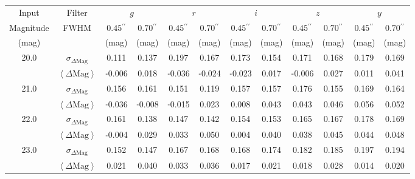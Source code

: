 \documentclass[useamsfonts]{pasj01}
\def\asec{$^{\prime\prime}$}
\def\cmodel{\texttt{cModel}}
\def\forced{\texttt{forced}}
\newcommand{\minus}{\raisebox{.4\height}{\scalebox{.8}{-}}}
\newcommand{\smag}{$\sigma_{\Delta\mathrm{Mag}}$}
\newcommand{\mmag}{$\left<{\Delta\mathrm{Mag}}\right>$}
\newcommand{\n}{$\minus$}
\begin{document}
\begin{table}
    \begin{center}
    \begin{tabular}{| c | c | c | c | c | c | c | c | c | c | c | c |}
    \hline
    \rowcolor[gray]{.85} \multicolumn{12}{|c|}{\large{Table}: Summary of \forced{} \cmodel{} Magnitude} \\
    \hline \hline 
    Input & Filter & \multicolumn{2}{|c|}{$g$} & \multicolumn{2}{|c|}{$r$} & \multicolumn{2}{|c|}{$i$} & \multicolumn{2}{|c|}{$z$} & \multicolumn{2}{|c|}{$y$} \\
    \cline{2-12}
    Magnitude & FWHM & $0.45$\asec{} & $0.70$\asec{} & $0.45$\asec{} & $0.70$\asec{} & $0.45$\asec{} & $0.70$\asec{} & $0.45$\asec{} & $0.70$\asec{} & $0.45$\asec{} & $0.70$\asec{} \\
    \hline
    (mag) & & (mag) & (mag) & (mag) & (mag) & (mag) & (mag) & (mag) & (mag) & (mag) & (mag) \\
    \hline
    
    \rowcolor[gray]{.85} 20.0 & \smag{} &   0.111 & 0.137  &   0.197 &   0.167 &   0.173 & 0.154 &    0.171 & 0.168 & 0.179 & 0.169 \\
    \rowcolor[gray]{.85}      & \mmag{} & \n0.006 & 0.018  & \n0.036 & \n0.024 & \n0.023 & 0.017 & \n0.006 & 0.027 & 0.011 & 0.041 \\
    \hline
    
    \rowcolor[gray]{1.0} 21.0 & \smag{} &   0.156 &   0.161  &   0.151 & 0.119 & 0.157 & 0.157 & 0.176 & 0.155 & 0.169 & 0.164 \\
    \rowcolor[gray]{1.0}      & \mmag{} & \n0.036 & \n0.008  & \n0.015 & 0.023 & 0.008 & 0.043 & 0.043 & 0.046 & 0.056 & 0.052 \\
    \hline
    
    \rowcolor[gray]{.85} 22.0 & \smag{} &   0.161 & 0.138  & 0.147 & 0.142 & 0.154 & 0.153 & 0.165 & 0.167 & 0.178 & 0.169 \\
    \rowcolor[gray]{.85}      & \mmag{} & \n0.004 & 0.029  & 0.033 & 0.050 & 0.004 & 0.040 & 0.038 & 0.045 & 0.044 & 0.048 \\
    \hline
    
    \rowcolor[gray]{1.0} 23.0 & \smag{} & 0.152 & 0.147  & 0.167 & 0.168 & 0.168 & 0.174 & 0.182 & 0.185 & 0.197 & 0.194 \\
    \rowcolor[gray]{1.0}      & \mmag{} & 0.021 & 0.040  & 0.033 & 0.036 & 0.017 & 0.021 & 0.018 & 0.028 & 0.014 & 0.020 \\
    \hline


\end{tabular}
\end{center}
\end{table}
\end{document}

